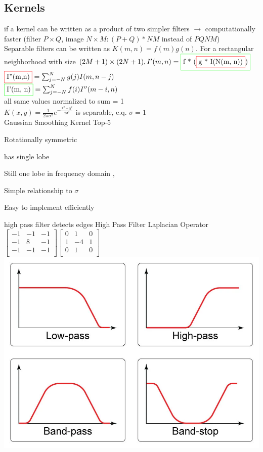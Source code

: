 \subsection*{Kernels}
 if a kernel can be written as a product of two simpler filters $\rightarrow$ computationally faster (filter $P \times Q$, image $N \times M: (P + Q) * NM$ instead of $PQNM$)\\
Separable filters can be written as \( K(m,n) = f(m)g(n) \).
For a rectangular neighborhood with size \((2M+1) \times (2N+1), I'(m, n) = \fcolorbox{green}{white}{f * (\fcolorbox{red}{white}{g * I(N(m, n))})}\)\\
$
\fcolorbox{red}{white}{I''(m,n)} = \sum_{j=-N}^{N} g(j) I(m, n - j)
$
\\
$\fcolorbox{green}{white}{I'(m, n)} = \sum_{j=-N}^{N} f(i) I''(m - i, n)$\\
 all same values normalized to sum = 1\\
 $K(x, y) = \frac{1}{2\pi \sigma^{2}} e^{-\frac{x^{2} + y^{2}}{2\sigma^{2}}}$ is separable, e.q. $\sigma = 1$\\
Gaussian Smoothing Kernel Top-5
\begin{compactitem}
\item Rotationally symmetric
\item has single lobe 
\item Still one lobe in frequency domain ,
\item Simple relationship to $\sigma$
\item Easy to implement efficiently
\end{compactitem}
high pass filter detects edges 
High Pass Filter Laplacian Operator \\
$
\begin{bmatrix}
        -1 & -1 & -1 \\
        -1 & 8 & -1 \\
        -1 & -1 & -1 \\
\end{bmatrix} 
$$
\begin{bmatrix}
        0 & 1 & 0 \\
        1 & -4 & 1 \\
        0 & 1 & 0 \\
\end{bmatrix} 
$
\includegraphics[width = 0.3 \columnwidth]{assets/jo/Types_of_Filters.png}

